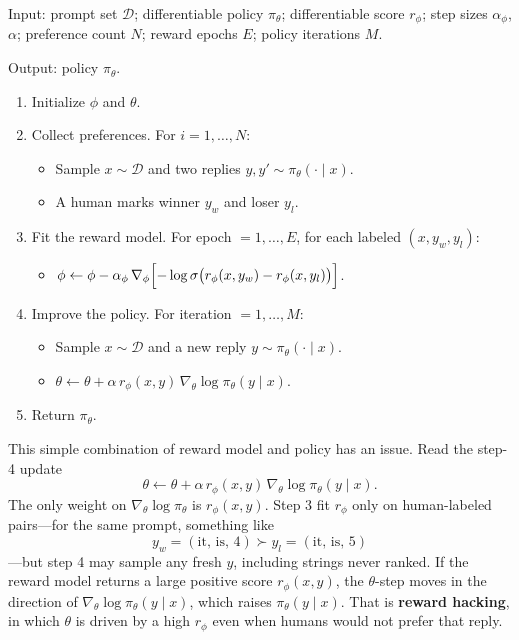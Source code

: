\begin{implnote}
Input: prompt set $\mathcal{D}$; differentiable policy $\pi_\theta$; differentiable score $r_\phi$; step sizes $\alpha_\phi$, $\alpha$; preference count $N$; reward epochs $E$; policy iterations $M$.

Output: policy $\pi_\theta$.

\begin{enumerate}
\item Initialize $\phi$ and $\theta$.
\item Collect preferences. For $i=1,\ldots,N$:
\begin{itemize}
\item Sample $x\sim\mathcal{D}$ and two replies $y,y'\sim\pi_\theta(\cdot\mid x)$.
\item A human marks winner $y_w$ and loser $y_l$.
\end{itemize}
\item Fit the reward model. For epoch $=1,\ldots,E$, for each labeled $(x,y_w,y_l)$:
\begin{itemize}
\item $\phi\leftarrow\phi-\alpha_\phi\,\nabla_\phi\Bigl[-\log\sigma\bigl(r_\phi(x,y_w)-r_\phi(x,y_l)\bigr)\Bigr]$.
\end{itemize}
\item Improve the policy. For iteration $=1,\ldots,M$:
\begin{itemize}
\item Sample $x\sim\mathcal{D}$ and a new reply $y\sim\pi_\theta(\cdot\mid x)$.
\item $\theta\leftarrow\theta+\alpha\,r_\phi(x,y)\,\nabla_\theta\log\pi_\theta(y\mid x)$.
\end{itemize}
\item Return $\pi_\theta$.
\end{enumerate}

\end{implnote}

This simple combination of reward model and policy has an issue. Read the step-4 update \[
\theta
\leftarrow
\theta+\alpha\,r_\phi(x,y)\,\nabla_\theta\log\pi_\theta(y\mid x).
\] The only weight on $\nabla_\theta\log\pi_\theta$ is $r_\phi(x,y)$. Step 3 fit $r_\phi$ only on human-labeled pairs---for the same prompt, something like \[
y_w=(\text{it},\,\text{is},\,4)\succ y_l=(\text{it},\,\text{is},\,5)
\] ---but step 4 may sample any fresh $y$, including strings never ranked. If the reward model returns a large positive score $r_\phi(x,y)$, the $\theta$-step moves in the direction of $\nabla_\theta\log\pi_\theta(y\mid x)$, which raises $\pi_\theta(y\mid x)$. That is \textbf{reward hacking}, in which $\theta$ is driven by a high $r_\phi$ even when humans would not prefer that reply.


